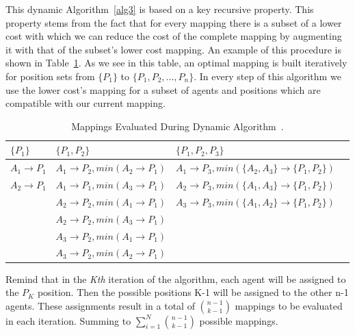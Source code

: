 This dynamic Algorithm~\ref{alg3} is based on a key recursive property. This property stems from the fact that for every mapping there is a subset of a lower cost with which we can reduce the cost of the complete mapping by augmenting it with that of the subset's lower cost mapping. An example of this procedure is shown in Table~\ref{tab:DynamicTable}. As we see in this table, an optimal mapping is built iteratively for position sets from $\lbrace P_{1} \rbrace$ to $\lbrace P_{1},P_{2},...,P_{n} \rbrace$. In every step of this algorithm we use the lower cost's mapping for a subset of agents and positions which are compatible with our current mapping.

\begin{table}[t!]
\label{tab:DynamicTable}
\centering
    \begin{tabular}{ | l | l | l | p{5cm} |}
    \hline
    $\lbrace P_{1} \rbrace$   & $\lbrace P_{1},P_{2} \rbrace$ 	& $\lbrace P_{1},P_{2},P_{3} \rbrace$\\ \hline
    $A_{1} \rightarrow P_{1}$ & $A_{1} \rightarrow P_{2},min(A_{2} \rightarrow P_{1})$	 	& $A_{1} \rightarrow P_{3},min(\lbrace A_{2},A_{3} \rbrace \rightarrow \lbrace P_{1},P_{2} \rbrace)$  \\ \hline
    $A_{2} \rightarrow P_{1}$ & $A_{1} \rightarrow P_{1},min(A_{3} \rightarrow P_{1})$	 	& $A_{2} \rightarrow P_{3},min(\lbrace A_{1},A_{3} \rbrace \rightarrow \lbrace P_{1},P_{2} \rbrace)$  \\ \hline
     						  & $A_{2} \rightarrow P_{2},min(A_{1} \rightarrow P_{1})$ 		& $A_{3} \rightarrow P_{3},min(\lbrace A_{1},A_{2} \rbrace \rightarrow \lbrace P_{1},P_{2} \rbrace)$  \\ \hline
       						  & $A_{2} \rightarrow P_{2},min(A_{3} \rightarrow P_{1})$ 		&   \\ \hline
       						  & $A_{3} \rightarrow P_{2},min(A_{1} \rightarrow P_{1})$ 		&   \\ \hline
    						  & $A_{3} \rightarrow P_{2},min(A_{2} \rightarrow P_{1})$		&   \\
    \hline

    \end{tabular}
    
    \caption{Mappings Evaluated During Dynamic Algorithm~\cite{UtAustinVillaPaper}.}    
\end{table}
Remind that in the \textit{Kth} iteration of the algorithm, each agent will be assigned to the $P_{K}$ position. Then the possible positions K-1 will be assigned to the other n-1 agents. These assignments result in a total of $ {{n-1}\choose{k-1}} $ mappings to be evaluated in each iteration. Summing to $\sum\limits_{i=1}^N{{n-1}\choose{k-1}}$ possible mappings.\\

